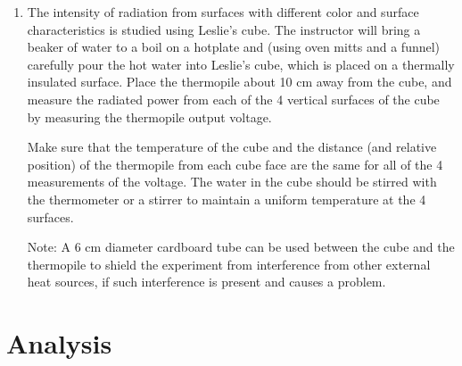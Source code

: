 \begin{enumerate}
\item \label{sec:lesliecube} The intensity of radiation from surfaces with different color and
surface characteristics is studied using Leslie's cube. The instructor will bring a
beaker of water to a boil on a hotplate and (using oven mitts and a
funnel) carefully pour the hot water into Leslie{\textquoteright}s
cube, which is placed on a thermally insulated surface.  Place the
thermopile about 10 cm away from the cube, and measure the radiated
power from each of the 4 vertical surfaces of the cube by measuring the
thermopile output voltage. 

Make sure that the temperature of the cube and the distance (and
relative position) of the thermopile from each cube face are the same
for all of the 4 measurements of the voltage.  The water in the cube
should be stirred with the thermometer or a stirrer to maintain a
uniform temperature at the 4 surfaces. 

Note:  A 6 cm diameter cardboard tube can be used between the cube and
the thermopile to shield the experiment from interference from other
external heat sources, if such interference is present and causes a
problem.

\end{enumerate}

\section{Analysis}

